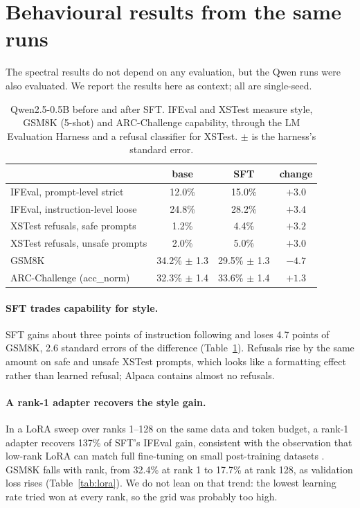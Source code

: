 \section{Behavioural results from the same runs}
\label{app:behavior}

The spectral results do not depend on any evaluation, but the Qwen runs were
also evaluated. We report the results here as context; all are single-seed.

\begin{table}[h]
\caption{Qwen2.5-0.5B before and after SFT. IFEval \citep{zhou2023ifeval} and
XSTest \citep{rottger2024xstest} measure style, GSM8K (5-shot) and
ARC-Challenge \citep{clark2018arc} capability, through the LM Evaluation
Harness \citep{eval-harness} and a refusal classifier for XSTest. $\pm$ is
the harness's standard error.}
\label{tab:evals}
\begin{center}
\small
\begin{tabular}{lccc}
\toprule
 & base & SFT & change \\
\midrule
IFEval, prompt-level strict      & 12.0\% & 15.0\% & $+3.0$ \\
IFEval, instruction-level loose  & 24.8\% & 28.2\% & $+3.4$ \\
XSTest refusals, safe prompts    & 1.2\%  & 4.4\%  & $+3.2$ \\
XSTest refusals, unsafe prompts  & 2.0\%  & 5.0\%  & $+3.0$ \\
GSM8K                            & 34.2\% $\pm$ 1.3 & 29.5\% $\pm$ 1.3 & $-4.7$ \\
ARC-Challenge (acc\_norm)        & 32.3\% $\pm$ 1.4 & 33.6\% $\pm$ 1.4 & $+1.3$ \\
\bottomrule
\end{tabular}
\end{center}
\end{table}

\paragraph{SFT trades capability for style.} SFT gains about three points of
instruction following and loses 4.7 points of GSM8K, 2.6 standard errors of
the difference (Table~\ref{tab:evals}). Refusals rise by the same amount on
safe and unsafe XSTest prompts, which looks like a formatting effect rather
than learned refusal; Alpaca contains almost no refusals.

\paragraph{A rank-1 adapter recovers the style gain.} In a LoRA sweep
\citep{hu2022lora} over ranks 1--128 on the same data and token budget, a
rank-1 adapter recovers 137\% of SFT's IFEval gain, consistent with the
observation that low-rank LoRA can match full fine-tuning on small
post-training datasets \citep{thinkingmachines2025lora}. GSM8K falls with
rank, from 32.4\% at rank 1 to 17.7\% at rank 128, as validation loss rises
(Table~\ref{tab:lora}). We do not lean on that trend: the lowest learning rate
tried won at every rank, so the grid was probably too high.

